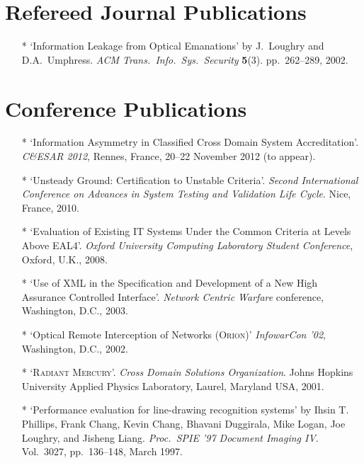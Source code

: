 \documentclass[letterpaper]{article}
\begin{document}
\section*{Refereed Journal Publications}

\begin{itemize}
    \item[*] `Information Leakage from Optical Emanations' by J.\ Loughry
    and D.A.\ Umphress. \emph{ACM Trans.\ Info.\ Sys.\ Security} \textbf{5}(3).
    pp.\ 262--289, 2002.
\end{itemize}

\section*{Conference Publications}

\begin{itemize}
	\item[*] `Information Asymmetry in Classified Cross Domain System Accreditation'.
		\emph{C\&ESAR 2012}, Rennes, France, 20--22 November 2012 (to appear).

	\item[*] `Unsteady Ground: Certification to Unstable Criteria'.
		\emph{Second International Conference on Advances in System Testing
		and Validation Life Cycle}. Nice, France, 2010. 

	\item[*] `Evaluation of Existing IT Systems Under the Common Criteria
		at Levels Above EAL4'. \emph{Oxford University
		Computing Laboratory Student Conference}, Oxford, U.K., 2008.

    \item[*] `Use of XML in the Specification and Development of a New High
		Assurance Controlled Interface'. \emph{Network Centric Warfare} conference,
		Washington, D.C., 2003.

    \item[*] `Optical Remote Interception of Networks (\textsc{Orion})'
		\emph{InfowarCon '02}, Washington, D.C., 2002.

    \item[*] `\textsc{Radiant Mercury}'. \emph{Cross Domain Solutions
		Organization}. Johns Hopkins University Applied Physics Laboratory,
		Laurel, Maryland USA, 2001.

    \item[*] `Performance evaluation for line-drawing recognition systems'
		by Ihsin T. Phillips, Frank Chang, Kevin Chang, Bhavani Duggirala,
		Mike Logan, Joe Loughry, and Jisheng Liang. \emph{Proc.\ SPIE '97
		Document Imaging IV}. Vol.\ 3027, pp.\ 136--148, March 1997.
\end{itemize}
\end{document}
